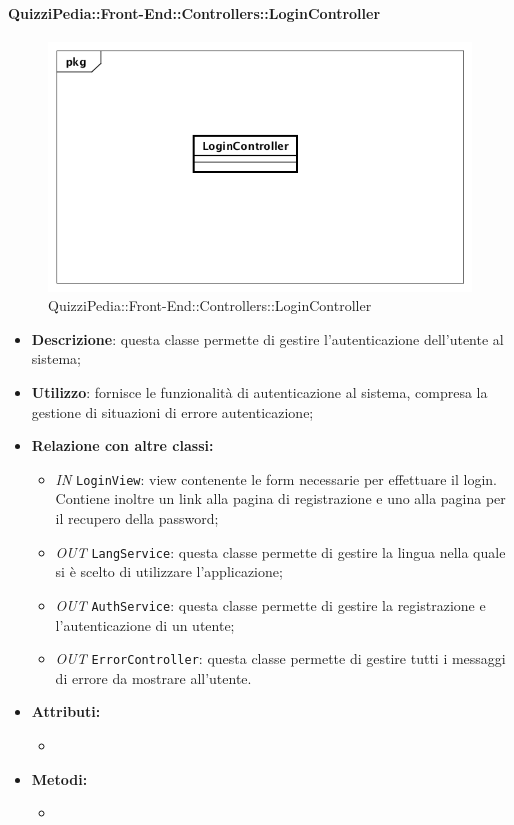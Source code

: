 \paragraph{QuizziPedia::Front-End::Controllers::LoginController}
\begin{figure}
	\centering
	\includegraphics[scale=0.45]{UML/Classi/Front-End/QuizziPedia_Front-end_Controller_LoginController.png}
	\caption{QuizziPedia::Front-End::Controllers::LoginController}
\end{figure}
\begin{itemize}
	\item \textbf{Descrizione}: questa classe permette di gestire l'autenticazione dell'utente al sistema; 
	\item \textbf{Utilizzo}: fornisce le funzionalità di autenticazione al sistema, compresa la gestione di situazioni di errore autenticazione;
	\item \textbf{Relazione con altre classi:}
	\begin{itemize}
		\item \textit{IN} \texttt{LoginView}: view contenente le form necessarie per effettuare il login. Contiene inoltre un link alla pagina di registrazione e uno alla pagina per il recupero della password;
		\item \textit{OUT} \texttt{LangService}: questa classe permette di gestire la lingua nella quale si è scelto di utilizzare l'applicazione;
		\item \textit{OUT} \texttt{AuthService}: questa classe permette di gestire la registrazione e l'autenticazione di un utente;
		\item \textit{OUT} \texttt{ErrorController}: questa classe permette di gestire tutti i messaggi di errore da mostrare all'utente.

	\end{itemize}
	\item \textbf{Attributi:}
	\begin{itemize}
		\item 
	\end{itemize}
	\item \textbf{Metodi:}
	\begin{itemize}
		\item 
	\end{itemize}
\end{itemize}


